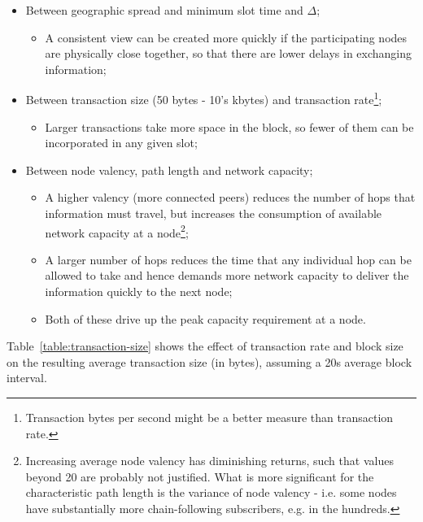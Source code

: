 \documentclass[11pt,a4paper]{article}
\begin{document}
\begin{itemize}
\item
  Between geographic spread and minimum slot time and $\Delta$;

  \begin{itemize}
  \item
    A consistent view can be created more quickly if the participating
    nodes are physically close together, so that there are lower delays
    in exchanging information;
  \end{itemize}
\item
  Between transaction size (50 bytes - 10's kbytes) and transaction
  rate\footnote{Transaction
    bytes per second might be a better measure than transaction rate.};

  \begin{itemize}
  \item
    Larger transactions take more space in the block, so fewer of them
    can be incorporated in any given slot;
  \end{itemize}
\item
  Between node valency, path length and network capacity;

  \begin{itemize}
  \item
    A higher valency (more connected peers) reduces the number of hops
    that information must travel, but increases the consumption of
    available network capacity at a node\footnote{Increasing average 
    node valency has
    diminishing returns, such that values beyond 20 are probably not
    justified. What is more significant for the characteristic path
    length is the variance of node valency - i.e. some
    nodes have substantially more chain-following
    subscribers, e.g. in the hundreds.};
  \item
    A larger number of hops reduces the time that any individual hop can
    be allowed to take and hence demands more network capacity to
    deliver the information quickly to the next node;
  \item
    Both of these drive up the peak capacity requirement at a node.
  \end{itemize}
\end{itemize}

Table~\ref{table:transaction-size} shows the effect of
transaction rate and block size on the resulting average 
transaction size (in bytes), assuming a 20s average block interval.
\end{document}
